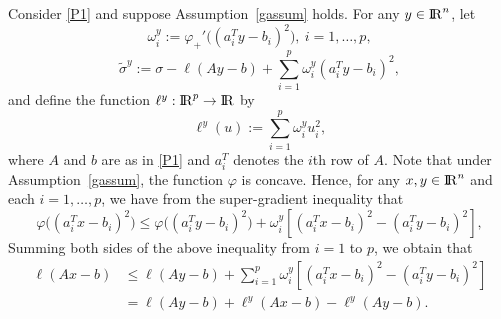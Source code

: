 \documentclass[10pt]{article}
\numberwithin{equation}{section}
\def\R{{\rm I\!R}}
\begin{document}
Consider \eqref{P1} and suppose Assumption~\ref{gassum} holds. For any $y\in\R^n$, let
\begin{equation}\label{defomega}
\omega_i^y := \varphi_+'\big((a_i^T y - b_i)^2\big), ~i= 1,\ldots, p,
\end{equation}
\begin{equation}\label{defsigma}
\tilde{\sigma}^y := \sigma - \ell(Ay - b) + \sum_{i=1}^p \omega_i^y(a_i^Ty - b_i)^2,
\end{equation}
and define the function $\ell^y:\R^p\to \R$ by
\begin{equation}\label{defell}
\ell^y(u):= \sum_{i=1}^p \omega_i^yu_i^2,
\end{equation}
where $A$ and $b$ are as in \eqref{P1} and $a_i^T$ denotes the $i$th row of $A$.
Note that under Assumption~\ref{gassum}, the function $\varphi$ is concave. Hence, for any $x,y\in\R^n$ and each $i=1,\ldots,p$, we have from the super-gradient inequality that
\[
\varphi\big((a_i^T x - b_i)^2\big) \leq \varphi\big((a_i^T y - b_i)^2\big) + \omega_i^y\left[(a_i^T x - b_i)^2 -(a_i^T y - b_i)^2\right],
\]
Summing both sides of the above inequality from $i=1$ to $p$, we obtain that
\begin{equation}\label{ell}
\begin{aligned}
\ell(Ax - b) &\leq \ell(Ay - b) + \sum_{i=1}^p \omega_i^y\left[(a_i^T x - b_i)^2 -(a_i^T y - b_i)^2\right]\\
& = \ell(Ay - b) + \ell^y(Ax - b) - \ell^y(Ay-b).
\end{aligned}
\end{equation}
\end{document}

